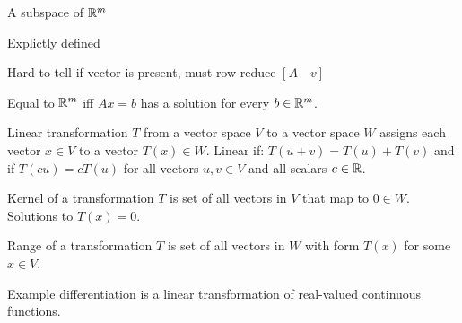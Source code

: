 \begin{card}
\begin{compactdesc}
        \begin{compactenum}
        \item A subspace of $\mathbb{R}^m$
        \item Explictly defined
        \item Hard to tell if vector is present, must row reduce $[A \quad v]$
        \item Equal to $\mathbb{R}^m$ iff $Ax = b$ has a solution for every $b \in \mathbb{R}^m$.
        \end{compactenum}
    \item[Linear transformation] $T$ from a vector space $V$ to a vector space
        $W$ assigns each vector $x \in V$ to a vector $T(x) \in W$.
        Linear if: $T(u + v) = T(u) + T(v)$ and if $T(cu) = cT(u)$ for all
        vectors $u,v \in V$ and all scalars $c \in \mathbb{R}$.
    \item[Kernel] of a transformation $T$ is set of all vectors in $V$ that
        map to $0 \in W$. Solutions to $T(x) = 0$.
    \item[Range] of a transformation $T$ is set of all vectors in $W$ with form
        $T(x)$ for some $x \in V$.
    \item[Example] differentiation is a linear transformation of
        real-valued continuous functions.
    \end{compactdesc}
\end{card}


